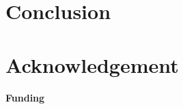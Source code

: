 \documentclass{bioinfo}
\begin{document}
\section{Conclusion}


\section*{Acknowledgement}

\paragraph{Funding\textcolon} %


%
%
%
%
%
%
%










\end{document}
